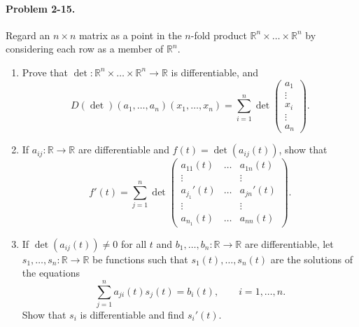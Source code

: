 \documentclass[11pt]{report}
\newcommand{\R}{\mathbb{R}}
\newcommand{\problem}[1]{\paragraph{Problem #1.}}
\begin{document}
    \problem{2-15} Regard an $n \times n$ matrix as a point in the $n$-fold product
    $\R^n \times \dots \times \R^n$ by considering each row as a member of $\R^n$.
    \begin{enumerate}
        \item Prove that $\det\colon \R^n \times \dots \times \R^n \to \R$ is
        differentiable, and \[
            D(\det)(a_1, \dots, a_n)(x_1, \dots, x_n) = \sum_{i = 1}^n \det \begin{pmatrix}
                a_1 \\ \vdots \\ x_i \\ \vdots \\ a_n
            \end{pmatrix}.
        \] 

        \item If $a_{ij}\colon \R \to \R$ are differentiable and $f(t) =
        \det(a_{ij}(t))$, show that \[
            f'(t) = \sum_{j = 1}^n \det \begin{pmatrix}
                a_{11}(t) &\dots &a_{1n}(t) \\
                \vdots & & \vdots \\
                a_{j_1}'(t) & \dots & a_{jn}'(t) \\
                \vdots & & \vdots \\
                a_{n_1}(t) & \dots & a_{nn}(t)
            \end{pmatrix}.
        \] 

        \item If $\det(a_{ij}(t)) \neq 0$ for all $t$ and $b_1, \dots, b_n\colon \R
        \to \R$ are differentiable, let $s_1, \dots, s_n\colon \R \to \R$ be
        functions such that $s_1(t), \dots, s_n(t)$ are the solutions of the
        equations \[
            \sum_{j = 1}^n a_{ji}(t)s_j(t) = b_i(t), \qquad i = 1, \dots, n.
        \] Show that $s_i$ is differentiable and find $s_i'(t)$.
    \end{enumerate}
\end{document}
